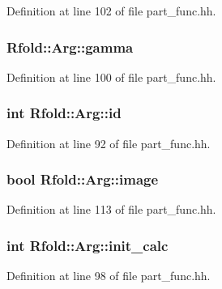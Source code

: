 Definition at line 102 of file part\+\_\+func.\+hh.

\hypertarget{class_rfold_1_1_arg_a54717ae319eecf4154dba39e42094b60}{
\subsubsection[{gamma}]{ Rfold\+::\+Arg\+::gamma}}\label{class_rfold_1_1_arg_a54717ae319eecf4154dba39e42094b60}


Definition at line 100 of file part\+\_\+func.\+hh.

\hypertarget{class_rfold_1_1_arg_a49ec979ca116afb70aa7a25bff04d3a8}{
\subsubsection[{id}]{\setlength{\rightskip}{0pt plus 5cm}int Rfold\+::\+Arg\+::id}}\label{class_rfold_1_1_arg_a49ec979ca116afb70aa7a25bff04d3a8}


Definition at line 92 of file part\+\_\+func.\+hh.

\hypertarget{class_rfold_1_1_arg_ab7df3ff6900da414d534707f37d87c2d}{
\subsubsection[{image}]{\setlength{\rightskip}{0pt plus 5cm}bool Rfold\+::\+Arg\+::image}}\label{class_rfold_1_1_arg_ab7df3ff6900da414d534707f37d87c2d}


Definition at line 113 of file part\+\_\+func.\+hh.

\hypertarget{class_rfold_1_1_arg_af97e7ba185a8a01a2d6baa5a1689f077}{
\subsubsection[{init\+\_\+calc}]{\setlength{\rightskip}{0pt plus 5cm}int Rfold\+::\+Arg\+::init\+\_\+calc}}\label{class_rfold_1_1_arg_af97e7ba185a8a01a2d6baa5a1689f077}


Definition at line 98 of file part\+\_\+func.\+hh.

